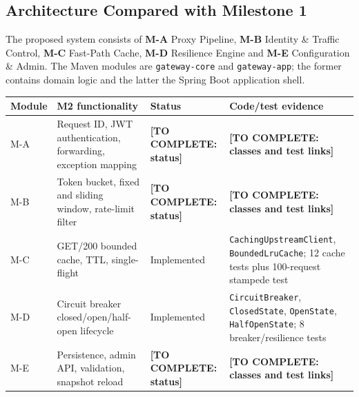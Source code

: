 \documentclass[12pt,a4paper]{article}
\newcommand{\todo}[1]{\textcolor{red!70!black}{\textbf{[TO COMPLETE: #1]}}}
\newcommand{\evidence}[1]{\texttt{#1}}
\begin{document}
\subsection{Architecture Compared with Milestone 1}
The proposed system consists of \textbf{M-A} Proxy Pipeline, \textbf{M-B} Identity \& Traffic Control, \textbf{M-C} Fast-Path Cache, \textbf{M-D} Resilience Engine and \textbf{M-E} Configuration \& Admin. The Maven modules are \texttt{gateway-core} and \texttt{gateway-app}; the former contains domain logic and the latter the Spring Boot application shell.
\begin{longtable}{L{1.2cm} L{3.8cm} L{2cm} L{5.2cm}}\toprule
\textbf{Module} & \textbf{M2 functionality} & \textbf{Status} & \textbf{Code/test evidence}\\\midrule\endhead
M-A & Request ID, JWT authentication, forwarding, exception mapping & \todo{status} & \todo{classes and test links}\\
M-B & Token bucket, fixed and sliding window, rate-limit filter & \todo{status} & \todo{classes and test links}\\
M-C & GET/200 bounded cache, TTL, single-flight & Implemented & \evidence{CachingUpstreamClient}, \evidence{BoundedLruCache}; 12 cache tests plus 100-request stampede test\\
M-D & Circuit breaker closed/open/half-open lifecycle & Implemented & \evidence{CircuitBreaker}, \evidence{ClosedState}, \evidence{OpenState}, \evidence{HalfOpenState}; 8 breaker/resilience tests\\
M-E & Persistence, admin API, validation, snapshot reload & \todo{status} & \todo{classes and test links}\\\bottomrule\end{longtable}
\end{document}
